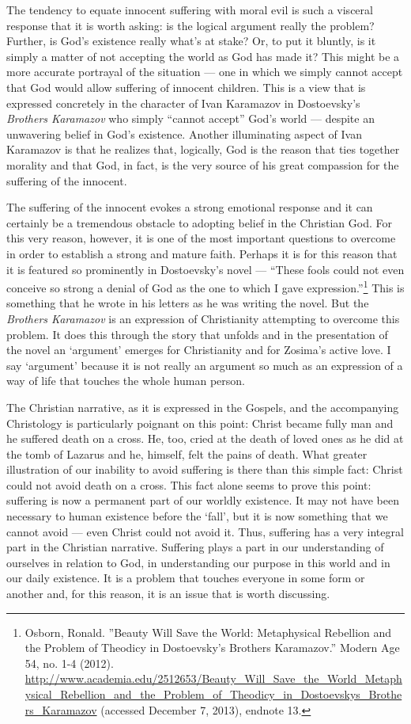 The tendency to equate innocent suffering with moral evil is such a visceral response that it is worth asking: is the logical argument really the problem? Further, is God's existence really what's at stake? Or, to put it bluntly, is it simply a matter of not accepting the world as God has made it? This might be a more accurate portrayal of the situation --- one in which we simply cannot accept that God would allow suffering of innocent children. This is a view that is expressed concretely in the character of Ivan Karamazov in Dostoevsky's \emph{Brothers Karamazov} who simply ``cannot accept” God's world --- despite an unwavering belief in God's existence. Another illuminating aspect of Ivan Karamazov is that he realizes that, logically, God is the reason that ties together morality and that God, in fact, is the very source of his great compassion for the suffering of the innocent.

The suffering of the innocent evokes a strong emotional response and it can certainly be a tremendous obstacle to adopting belief in the Christian God. For this very reason, however, it is one of the most important questions to overcome in order to establish a strong and mature faith. Perhaps it is for this reason that it is featured so prominently in Dostoevsky's novel --- ``These fools could not even conceive so strong a denial of God as the one to which I gave expression.”\footnote{Osborn, Ronald. ''Beauty Will Save the World: Metaphysical Rebellion and the Problem of Theodicy in Dostoevsky's Brothers Karamazov.'' Modern Age 54, no. 1-4 (2012). \url{http://www.academia.edu/2512653/Beauty_Will_Save_the_World_Metaphysical_Rebellion_and_the_Problem_of_Theodicy_in_Dostoevskys_Brothers_Karamazov} (accessed December 7, 2013), endnote 13.} This is something that he wrote in his letters as he was writing the novel. But the \emph{Brothers Karamazov} is an expression of Christianity attempting to overcome this problem. It does this through the story that unfolds and in the presentation of the novel an `argument' emerges for Christianity and for Zosima's active love. I say `argument' because it is not really an argument so much as an expression of a way of life that touches the whole human person.

The Christian narrative, as it is expressed in the Gospels, and the accompanying Christology is particularly poignant on this point: Christ became fully man and he suffered death on a cross. He, too, cried at the death of loved ones as he did at the tomb of Lazarus and he, himself, felt the pains of death. What greater illustration of our inability to avoid suffering is there than this simple fact: Christ could not avoid death on a cross. This fact alone seems to prove this point: suffering is now a permanent part of our worldly existence. It may not have been necessary to human existence before the `fall', but it is now something that we cannot avoid --- even Christ could not avoid it. Thus, suffering has a very integral part in the Christian narrative. Suffering plays a part in our understanding of ourselves in relation to God, in understanding our purpose in this world and in our daily existence. It is a problem that touches everyone in some form or another and, for this reason, it is an issue that is worth discussing.

